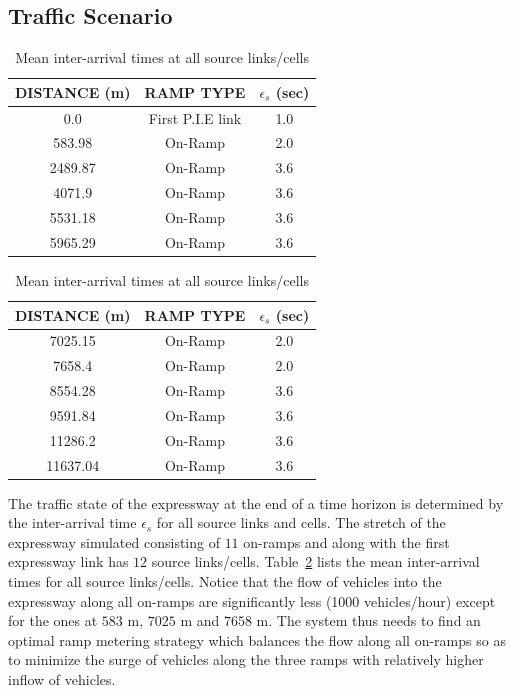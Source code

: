 \documentclass{wscpaperproc}
\theoremstyle{wsc}
\begin{document}
 \subsection{Traffic Scenario}
 \begin{table}[!htbp]
 \caption{Mean inter-arrival times at all source links/cells}
 \begin{tabular}[b]{ccc}\hline
       {\bf DISTANCE} (m) & {\bf RAMP TYPE} & {\bf $\epsilon_s$} (sec)\\ \hline
      0.0 & First P.I.E link & 1.0\\
      583.98 & On-Ramp & 2.0\\ 
      2489.87 & On-Ramp & 3.6\\ 
      4071.9 & On-Ramp & 3.6\\ 
      5531.18 & On-Ramp & 3.6\\ 
      5965.29 & On-Ramp & 3.6\\ \hline
      \end{tabular}
      \quad
      \begin{tabular}[b]{ccc}\hline
        {\bf DISTANCE} (m) & {\bf RAMP TYPE}& {\bf $\epsilon_s$} (sec) \\ \hline
      7025.15 & On-Ramp & 2.0\\ 
      7658.4 & On-Ramp & 2.0\\ 
      8554.28 & On-Ramp & 3.6\\ 
      9591.84 & On-Ramp & 3.6\\ 
      11286.2 & On-Ramp & 3.6\\ 
      11637.04 & On-Ramp & 3.6\\ \hline
     \end{tabular}
       \label{table:iat}
 \end{table}
 
  The traffic state of the expressway at the end of a time horizon is determined by the inter-arrival time $\epsilon_s$ for all source links and cells. The stretch of the expressway simulated consisting of $11$ on-ramps and along with the first expressway link has $12$ source links/cells. Table~\ref{table:iat} lists the mean inter-arrival times for all source links/cells. Notice that the flow of vehicles into the expressway along all on-ramps  are significantly less (1000 vehicles/hour) except for the ones at $583$ m, $7025$ m and $7658$ m. The system thus needs to find an optimal ramp metering strategy which balances the flow along all on-ramps so as to minimize the surge of vehicles along the three ramps with relatively higher inflow of vehicles.
 
\end{document}
